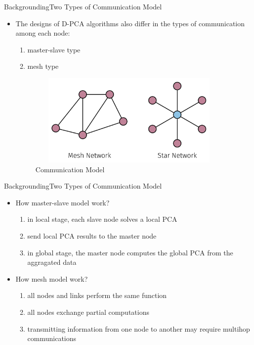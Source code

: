 \documentclass{beamer}
\begin{document}
\begin{frame}{Backgrounding}{Two Types of Communication Model}
	 \begin{itemize}
		\item{
			The designs of D-PCA algorithms also differ in the types of communication among each node:
			\begin{enumerate}
  				\item master-slave type
  				\item mesh type
			\end{enumerate}
			\begin{figure}[ht]
				\centering
				\includegraphics[width=10cm,height=4.5cm]{1.png}
				\caption{Communication Model} 
				\label{Communication Model}	
			\end{figure}
		}
	 \end{itemize}
\end{frame}


\begin{frame}{Backgrounding}{Two Types of Communication Model}
	 \begin{itemize}
		\item{
			How master-slave model work?
			\begin{enumerate}
			  \item in local stage, each slave node solves a local PCA
			  \item send local PCA results to the master node
			  \item in global stage, the master node computes the global PCA from the aggragated data
			\end{enumerate}
		}
		\item{
			How mesh model work?
			\begin{enumerate}
			  \item all nodes and links perform the same function
			  \item all nodes exchange partial computations
			  \item transmitting information from one node to another may require multihop communications
			\end{enumerate}
		}
	 \end{itemize}
\end{frame}
\end{document}
